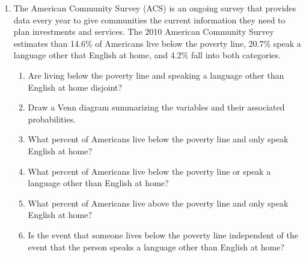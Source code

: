 \documentclass{article}\usepackage[]{graphicx}\usepackage[]{color}
\begin{document}
\begin{enumerate}
\item The American Community Survey (ACS) is an ongoing survey that provides data every year to give communities the current information they need to plan investments and services. The 2010 American Community Survey estimates than 14.6\% of Americans live below the poverty line, 20.7\% speak a language other that English at home, and 4.2\% fall into both categories.
\begin{enumerate}
\item Are living below the poverty line and speaking a language other than English at home disjoint?
\item Draw a Venn diagram summarizing the variables and their associated probabilities.
\item What percent of Americans live below the poverty line and only speak English at home?
\item What percent of Americans live below the poverty line or speak a language other than English at home?
\item What percent of Americans live above the poverty line and only speak English at home? 
\item Is the event that someone lives below the poverty line independent of the event that the person speaks a language other than English at home?
\end{enumerate}




\end{enumerate}
\end{document}
